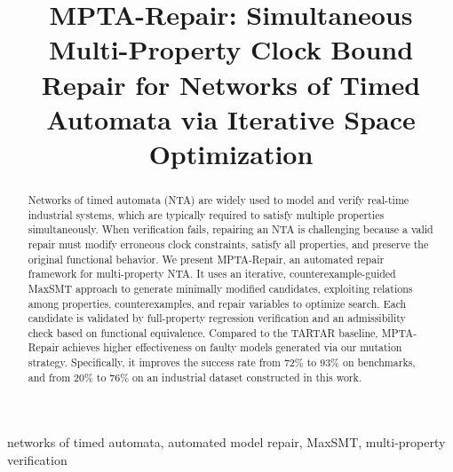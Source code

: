 \documentclass[conference]{IEEEtran}
\begin{document}
\title{MPTA-Repair: Simultaneous Multi-Property Clock Bound Repair for Networks of Timed Automata via Iterative Space Optimization}
\author{%
}
\maketitle
\begin{abstract}
Networks of timed automata (NTA) are widely used to model and verify real-time industrial systems, which are typically required to satisfy multiple properties simultaneously. When verification fails, repairing an NTA is challenging because a valid repair must modify erroneous clock constraints, satisfy all properties, and preserve the original functional behavior. We present MPTA-Repair, an automated repair framework for multi-property NTA. It uses an iterative, counterexample-guided MaxSMT approach to generate minimally modified candidates, exploiting relations among properties, counterexamples, and repair variables to optimize search. Each candidate is validated by full-property regression verification and an admissibility check based on functional equivalence. Compared to the TARTAR baseline, MPTA-Repair achieves higher effectiveness on faulty models generated via our mutation strategy. Specifically, it improves the success rate from 72\% to 93\% on benchmarks, and from 20\% to 76\% on an industrial dataset constructed in this work.
\end{abstract}
\begin{IEEEkeywords}
networks of timed automata, automated model repair, MaxSMT, multi-property verification
\end{IEEEkeywords}







\end{document}
